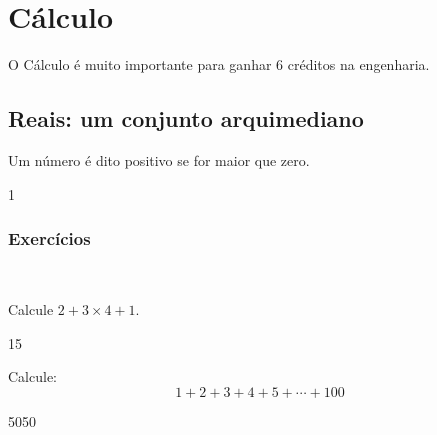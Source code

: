 
\setlength{\headheight}{30pt} %
\chapter{Cálculo}\label{cap_introducao}
O Cálculo é muito importante para ganhar 6 créditos na engenharia.

\section{Reais: um conjunto arquimediano}\label{sec_def_trans_lap}

\begin{defn}
    Um número é dito positivo se for maior que zero.
\end{defn}

1

\subsection*{Exercícios}
~
\begin{exer} Calcule $2 + 3\times 4 + 1$.
\end{exer}
\begin{resp}
15
\end{resp}

\begin{exer} Calcule:
    \begin{equation}
        1 + 2 + 3 + 4 + 5 + \cdots + 100
    \end{equation}
\end{exer}
\begin{resp}
    5050
\end{resp}
    
